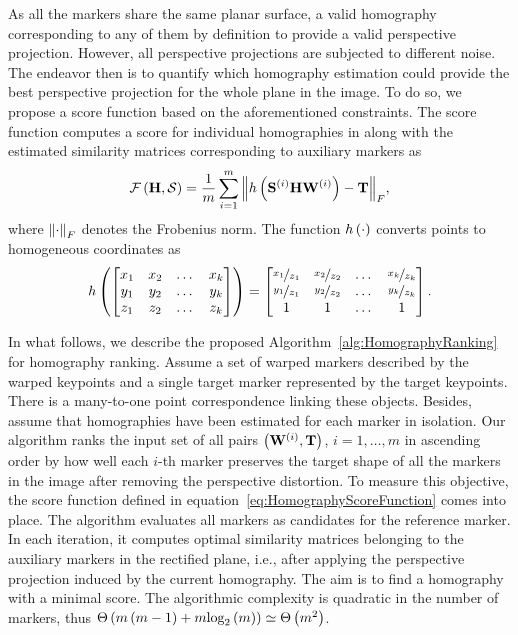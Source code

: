 As all the markers share the same planar surface, a valid homography corresponding to any of them by definition to provide a valid perspective projection. However, all perspective projections are subjected to different noise. The endeavor then is to quantify which homography estimation could provide the best perspective projection for the whole plane in the image. To do so, we propose a score function based on the aforementioned constraints. The score function computes a score for individual homographies in along with the estimated similarity matrices corresponding to auxiliary markers as
\begin{equation}
    \label{eq:HomographyScoreFunction}
    {\mathcal{F}} \left( \mathbf{H}, \mathcal{S} \right) =
    \frac{1}{m}
    \sum_{i = 1}^{m}
    {\left\Vert {
        {h} \left( 
            {\mathbf{S}}^{\left( {i} \right)}
            \mathbf{H}{\mathbf{W}}^{\left( {i} \right)}
         \right)
        -
        \mathbf{T}
    } \right\Vert}_F,
\end{equation}
where ${\left\Vert {\cdot} \right\Vert}_F$ denotes the Frobenius norm. The function ${h} \left( \cdot \right)$ converts points to homogeneous coordinates as
\begin{equation}
    \label{eq:HomoCoordsConversion}
    {h} \left( 
        \begin{bmatrix}
            x_1 & x_2 & \dots & x_k \\
            y_1 & y_2 & \dots & y_k \\
            z_1 & z_2 & \dots & z_k
        \end{bmatrix}
     \right) =
    \begin{bmatrix}
        \nicefrac{x_1}{z_1} & \nicefrac{x_2}{z_2} & \dots & \nicefrac{x_k}{z_k} \\
        \nicefrac{y_1}{z_1} & \nicefrac{y_2}{z_2} & \dots & \nicefrac{y_k}{z_k} \\
        1                   & 1                   & \dots & 1
    \end{bmatrix}.
\end{equation}

In what follows, we describe the proposed Algorithm~\ref{alg:HomographyRanking} for homography ranking. Assume a set of warped markers described by the warped keypoints and a single target marker represented by the target keypoints. There is a many-to-one point correspondence linking these objects. Besides, assume that homographies have been estimated for each marker in isolation. Our algorithm ranks the input set of all pairs $\left( {{\mathbf{W}}^{\left( {i} \right)}, \mathbf{T}} \right)$, $i = 1, \dots, m$ in ascending order by how well each $i$-th marker preserves the target shape of all the markers in the image after removing the perspective distortion. To measure this objective, the score function defined in equation~\ref{eq:HomographyScoreFunction} comes into place. The algorithm evaluates all markers as candidates for the reference marker. In each iteration, it computes optimal similarity matrices belonging to the auxiliary markers in the rectified plane, i.e., after applying the perspective projection induced by the current homography. The aim is to find a homography with a minimal score. The algorithmic complexity is quadratic in the number of markers, thus ${\Theta} \left( m \left( {m - 1} \right) + m {\text{log}_2} \left( m \right) \right) \simeq {\Theta} \left( m^2 \right)$.

